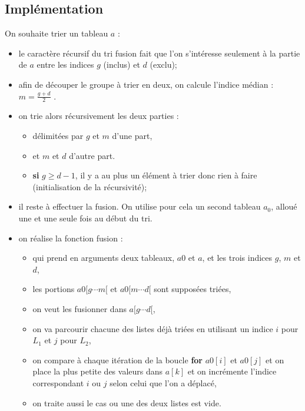 \subsection{Implémentation}


On souhaite trier un tableau $a$ :
\begin{itemize}
\item le caractère récursif du tri fusion fait que l'on s'intéresse seulement à la partie de $a$ entre les indices $g$ (inclus) et $d$ (exclu);
\item afin de découper le groupe à trier en deux, on calcule l'indice médian :
$m = \frac{g+d}{2}$ . 

\item on trie alors récursivement les deux parties :
\begin{itemize}
\item délimitées par $g$ et $m$ d'une part,
\item et $m$ et $d$ d'autre part.
\item \textbf{si} \textbf{$g\geq d-1$}, il y a au plus un élément à trier donc rien à faire (initialisation de la récursivité);
\end{itemize}


%		


\item il reste à effectuer la fusion. On utilise pour cela un second tableau $a_0$, alloué une et une seule fois au
début du tri.
\item on réalise la fonction fusion :
\begin{itemize}
\item qui prend en arguments deux tableaux, $a0$ et $a$, et les trois indices $g$, $m$ et $d$,
\item les portions $a0[g \cdots  m[$ et $a0[m \cdots d[$ sont supposées triées,
\item on veut les fusionner dans $a[g\cdots d[$,
\item on va parcourir chacune des listes déjà triées en utilisant un indice $i$ pour $L_1$ et $j$ pour $L_2$,
\item on compare à chaque itération de la boucle \textbf{for} $a0[i]$ et $a0[j]$ et on place la plus petite des valeurs dans $a[k]$ et on incrémente l'indice correspondant $i$ ou $j$ selon celui que l'on a déplacé,
\item on traite aussi le cas ou une des deux listes est vide.
\end{itemize}


%		


\end{itemize}
%


